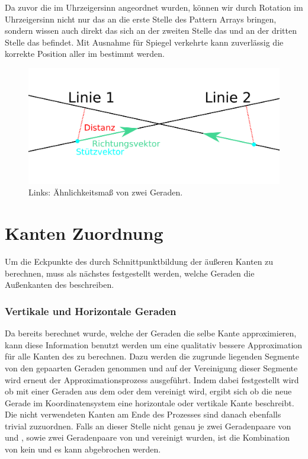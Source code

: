 Da zuvor die \fps im Uhrzeigersinn angeordnet wurden, können wir durch Rotation im Uhrzeigersinn nicht nur das \olfp an die erste Stelle des Pattern Arrays bringen, sondern wissen auch direkt das sich an der zweiten Stelle das \orfp und an der dritten Stelle das \ulfp befindet. Mit Ausnahme für Spiegel verkehrte \QRCodes kann zuverlässig die korrekte Position aller \fps im \QRCode bestimmt werden.

\begin{figure}[h]
\center
\includegraphics[scale=1]{images/similarity_measure.png}
\caption{Links: Ähnlichkeitsmaß von zwei Geraden.}
\end{figure}

\section{Kanten Zuordnung}
Um die Eckpunkte des \QRCodes durch Schnittpunktbildung der äußeren Kanten zu berechnen, muss als nächstes festgestellt werden, welche Geraden die Außenkanten des \QRCodes beschreiben.

\subsubsection{Vertikale und Horizontale Geraden}
Da bereits berechnet wurde, welche der Geraden die selbe Kante approximieren, kann diese Information benutzt werden um eine qualitativ bessere Approximation für alle Kanten des \olfp zu berechnen. Dazu werden die zugrunde liegenden Segmente von den gepaarten Geraden genommen und auf der Vereinigung dieser Segmente wird erneut der Approximationsprozess ausgeführt. Indem dabei festgestellt wird ob mit einer Geraden aus dem \orfp oder dem \ulfp vereinigt wird, ergibt sich ob die neue Gerade im \QRCode Koordinatensystem eine horizontale oder vertikale Kante beschreibt. Die nicht verwendeten Kanten am Ende des Prozesses sind danach ebenfalls trivial zuzuordnen. Falls an dieser Stelle nicht genau je zwei Geradenpaare von \olfp und \orfp, sowie zwei Geradenpaare von \olfp und \orfp vereinigt wurden, ist die Kombination von \fps kein \QRCode und es kann abgebrochen werden.

